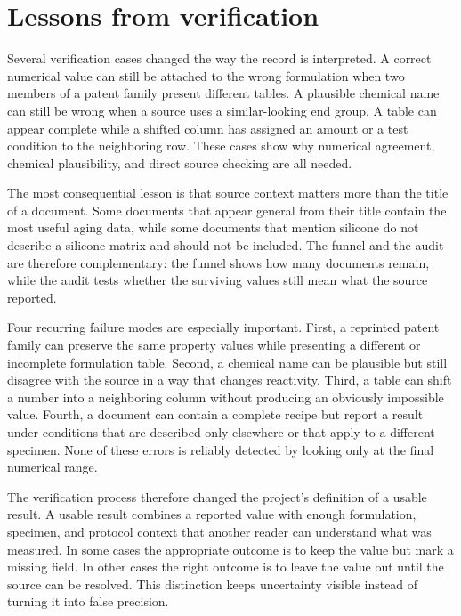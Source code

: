\documentclass[10pt]{article}
\begin{document}
\section{Lessons from verification}
Several verification cases changed the way the record is interpreted. A
correct numerical value can still be attached to the wrong formulation when
two members of a patent family present different tables. A plausible chemical
name can still be wrong when a source uses a similar-looking end group. A
table can appear complete while a shifted column has assigned an amount or a
test condition to the neighboring row. These cases show why numerical
agreement, chemical plausibility, and direct source checking are all needed.

The most consequential lesson is that source context matters more than the
title of a document. Some documents that appear general from their title
contain the most useful aging data, while some documents that mention silicone
do not describe a silicone matrix and should not be included. The funnel and
the audit are therefore complementary: the funnel shows how many documents
remain, while the audit tests whether the surviving values still mean what the
source reported.

Four recurring failure modes are especially important. First, a reprinted
patent family can preserve the same property values while presenting a
different or incomplete formulation table. Second, a chemical name can be
plausible but still disagree with the source in a way that changes reactivity.
Third, a table can shift a number into a neighboring column without producing
an obviously impossible value. Fourth, a document can contain a complete
recipe but report a result under conditions that are described only elsewhere
or that apply to a different specimen. None of these errors is reliably
detected by looking only at the final numerical range.

The verification process therefore changed the project's definition of a
usable result. A usable result combines a reported value with enough
formulation, specimen, and protocol context that another reader can understand
what was measured. In some cases the appropriate outcome is to keep the value
but mark a missing field. In other cases the right outcome is to leave the
value out until the source can be resolved. This distinction keeps uncertainty
visible instead of turning it into false precision.
\end{document}
